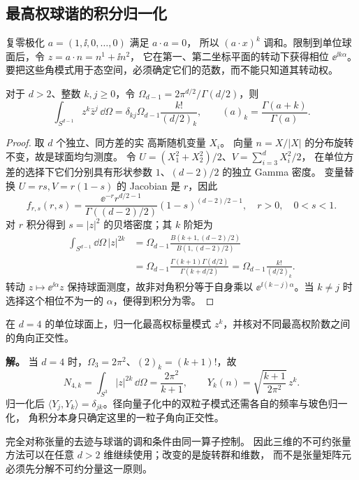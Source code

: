 \subsection{最高权球谐的积分归一化}

复零极化 $a=(1,\ii,0,\ldots,0)$ 满足 $a\cdot a=0$，
所以 $(a\cdot x)^k$ 调和。限制到单位球面后，令 $z=a\cdot n=n^1+\ii n^2$，
它在第一、第二坐标平面的转动下获得相位 $\ee^{\ii k\alpha}$。
要把这些角模式用于态空间，必须确定它们的范数，而不能只知道其转动权。

\begin{proposition}[复零极化球谐的范数]
\label{prop:ghs-highest-harmonic-integral}
对于 $d>2$、整数 $k,j\geq0$，令 $\Omega_{d-1}=2\pi^{d/2}/\Gamma(d/2)$，则
\begin{equation}\label{eq:ghs-highest-harmonic-integral}
 \int_{S^{d-1}}z^k\bar z^j\,\dd\Omega
 =\delta_{kj}\Omega_{d-1}\frac{k!}{(d/2)_k},
 \qquad (a)_k=\frac{\Gamma(a+k)}{\Gamma(a)}.
\end{equation}
\end{proposition}
\begin{proof}
取 $d$ 个独立、同方差的实 高斯随机变量 $X_i$。
向量 $n=X/|X|$ 的分布旋转不变，故是球面均匀测度。
令 $U=(X_1^2+X_2^2)/2$、$V=\sum_{i=3}^dX_i^2/2$，
在单位方差的选择下它们分别具有形状参数 $1$、$(d-2)/2$ 的独立 Gamma 密度。
变量替换 $U=rs,V=r(1-s)$ 的 Jacobian 是 $r$，因此
\[
 f_{r,s}(r,s)=\frac{\ee^{-r}r^{d/2-1}}{\Gamma((d-2)/2)}
 (1-s)^{(d-2)/2-1},\quad r>0,\quad0<s<1.
\]
对 $r$ 积分得到 $s=|z|^2$ 的贝塔密度；其 $k$ 阶矩为
\begin{align*}
 \int_{S^{d-1}}\dd\Omega\,|z|^{2k}
 &=\Omega_{d-1}\frac{B(k+1,(d-2)/2)}{B(1,(d-2)/2)}\\
 &=\Omega_{d-1}\frac{\Gamma(k+1)\Gamma(d/2)}{\Gamma(k+d/2)}
 =\Omega_{d-1}\frac{k!}{(d/2)_k}.
\end{align*}
转动 $z\mapsto\ee^{\ii\alpha}z$ 保持球面测度，故非对角积分等于自身乘以
$\ee^{\ii(k-j)\alpha}$。当 $k\ne j$ 时选择这个相位不为一的 $\alpha$，便得到积分为零。
\end{proof}

\begin{example}[四维最高权模式]
在 $d=4$ 的单位球面上，归一化最高权标量模式 $z^k$，并核对不同最高权阶数之间的角向正交性。

\textbf{解。} 当 $d=4$ 时，$\Omega_3=2\pi^2$、$(2)_k=(k+1)!$，故
\[
 N_{4,k}=\int_{S^3}|z|^{2k}\,\dd\Omega=\frac{2\pi^2}{k+1},
 \qquad Y_k(n)=\sqrt{\frac{k+1}{2\pi^2}}\,z^k.
\]
归一化后 $\langle Y_j,Y_k\rangle=\delta_{jk}$。径向量子化中的双粒子模式还需各自的频率与玻色归一化，
角积分本身只确定这里的一粒子角向正交性。
\end{example}

完全对称张量的去迹与球谐的调和条件由同一算子控制。
因此三维的不可约张量方法可以在任意 $d>2$ 维继续使用；改变的是旋转群和维数，
而不是张量矩阵元必须先分解不可约分量这一原则。
